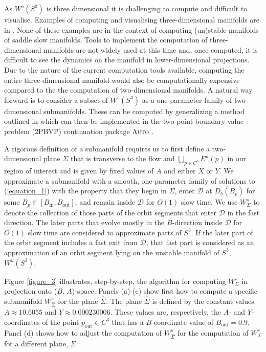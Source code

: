\documentclass{ws-ijbc}
\begin{document}
As $W^{s}(S^3)$ is three dimensional it is challenging to compute and difficult to visualise.  Examples of computing and visualising three-dimensional manifolds are in \cite{Initial_conditions_volume, Invariant_tori_again, Invariant_tori}.  None of these examples are in the context of computing (un)stable manifolds of saddle slow manifolds.  Tools to implement the computation of three-dimensional manifolds are not widely used at this time and, once computed, it is difficult to see the dynamics on the manifold in lower-dimensional projections.  Due to the nature of the current computation tools available, computing the entire three-dimensional manifold would also be computationally expensive compared to the the computation of two-dimensional manifolds.  A natural way forward is to consider a subset of $W^{s}(S^3)$ as a one-parameter family of two-dimensional submanifolds.  These can be computed by generalizing a method outlined in \cite{Saeed_Paper} which can then be implemented in the two-point boundary value problem (2PBVP) continuation package \textsc{Auto} \cite{AUTO}.  

A rigorous definition of a submanifold requires us to first define a two-dimensional plane $\Sigma$ that is transverse to the flow and $\bigcup_{p \in C^3} E^u(p)$ in our region of interest and is given by fixed values of $A$ and either $X$ or $Y$.  We approximate a submanifold with a smooth, one-parameter family of solutions to (\ref{equation_1}) with the property that they begin in $\Sigma$, enter $\mathscr{D}$ at $D_{\delta}(B_p)$ for some $B_p \in [B_{\text{in}}, B_{\text{out}}]$, and remain inside $\mathscr{D}$ for $O(1)$ slow time.  We use $W^{s}_{\Sigma}$ to denote the collection of those parts of the orbit segments that enter $\mathscr{D}$ in the fast direction.  The later parts that evolve mostly in the $B$-direction inside $\mathscr{D}$ for $O(1)$ slow time are considered to approximate parts of $S^3$.  If the later part of the orbit segment includes a fast exit from $\mathscr{D}$, that fast part is considered as an approximation of an orbit segment lying on the unstable manifold of $S^3$, $W^{u}(S^3)$.

Figure \ref{figure_3} illustrates, step-by-step, the algorithm for computing $W^s_\Sigma$ in projection onto ($B$, $A$)-space.  Panels (a)-(c) show first how to compute a specific submanifold $W^s_{\widehat{\Sigma}}$ for the plane $\widehat{\Sigma}$.  The plane $\widehat{\Sigma}$ is defined by the constant values $A \approx 10.6055$ and $Y \approx 0.000230006$.  These values are, respectively, the $A$- and $Y$-coordinates of the point $p_{\text{out}} \in C^3$ that has a $B$-coordinate value of $B_{\text{out}}=0.9$.  Panel (d) shows how to adjust the computation of $W^{s}_{\widehat{\Sigma}}$ for the computation of $W^{s}_\Sigma$ for a different plane, $\Sigma$.
\end{document}
